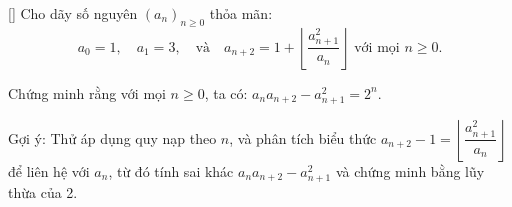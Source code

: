 \documentclass[../04-diophantine-equations.tex]{subfiles}
\begin{document}
\begin{exercise*}\label{example:GBR-2015-TST-F1-P2}[\textbf{}]
    Cho dãy số nguyên \( (a_n)_{n \ge 0} \) thỏa mãn:
    \[
        a_0 = 1, \quad a_1 = 3, \quad \text{và} \quad a_{n+2} = 1 + \left\lfloor \frac{a_{n+1}^2}{a_n} \right\rfloor \text{ với mọi } n \ge 0.
    \]
    
    Chứng minh rằng với mọi \(n \ge 0\), ta có: $a_n a_{n+2} - a_{n+1}^2 = 2^n.$
\end{exercise*}

\begin{remark*}
    Gợi ý: Thử áp dụng quy nạp theo \(n\), và phân tích biểu thức \(a_{n+2} - 1 = \left\lfloor \dfrac{a_{n+1}^2}{a_n} \right\rfloor\) để liên hệ với \(a_n\),
    từ đó tính sai khác \(a_n a_{n+2} - a_{n+1}^2\) và chứng minh bằng lũy thừa của 2.
\end{remark*}
\end{document}
